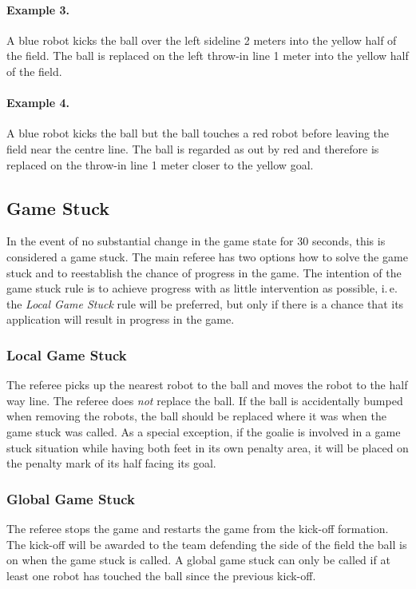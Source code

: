 \documentclass[12pt]{article}
\newcommand{\ie}{\mbox{i.\,e.}\xspace}
\begin{document}
\paragraph{Example 3.} A blue robot kicks the ball over the left sideline 2 meters into the yellow half of the field. The ball is replaced on the left throw-in line 1 meter into the yellow half of the field.

\paragraph{Example 4.} A blue robot kicks the ball but the ball touches a red robot before leaving the field near the centre line. The ball is regarded as out by red and therefore is replaced on the throw-in line 1 meter closer to the yellow goal.

\subsection{Game Stuck}

In the event of no substantial change in the game state for 30 seconds, this is considered a game stuck. The main referee has two options how to solve the game stuck and to reestablish the chance of progress in the game. The intention of the game stuck rule is to achieve progress with as little intervention as possible, \ie the \emph{Local Game Stuck} rule will be preferred, but only if there is a chance that its application will result in progress in the game.

\subsubsection{Local Game Stuck}

The referee picks up the nearest robot to the ball and moves the robot to the half way line. The referee does \emph{not} replace the ball. If the ball is accidentally bumped when removing the robots, the ball should be replaced where it was when the game stuck was called. As a special exception, if the goalie is involved in a game stuck situation while having both feet in its own penalty area, it will be placed on the penalty mark of its half facing its goal.

\subsubsection{Global Game Stuck}

The referee stops the game and restarts the game from the kick-off formation. The kick-off will be awarded to the team defending the side of the field the ball is on when the game stuck is called. A global game stuck can only be called if at least one robot has touched the ball since the previous kick-off.
\end{document}
